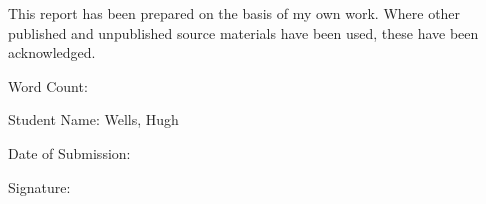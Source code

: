 \begin{declaration}
    \begin{center}

        This report has been prepared on the basis of my own work. Where other published and unpublished source materials have been used, these have been acknowledged.

        \vspace{3em}

        Word Count: 

        \vspace{3em}

        Student Name: Wells, Hugh

        \vspace{3em}

        Date of Submission: 

        \vspace{3em}

        Signature:

    \end{center}
\end{declaration}